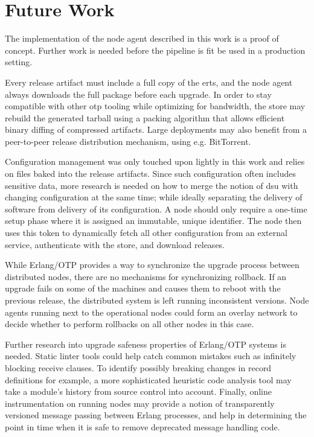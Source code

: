 \cleardoublepage
\section{Future Work}

The implementation of the node agent described in this work is a proof of concept. Further work is needed before the pipeline is fit be used in a production setting.

Every release artifact must include a full copy of the \acrshort{erts}, and the node agent always downloads the full package before each upgrade. In order to stay compatible with other \acrshort{otp} tooling while optimizing for bandwidth, the store may rebuild the generated tarball using a packing algorithm that allows efficient binary diffing of compressed artifacts.
Large deployments may also benefit from a peer-to-peer release distribution mechanism, using e.g. BitTorrent.

Configuration management was only touched upon lightly in this work and relies on files baked into the release artifacts. Since such configuration often includes sensitive data, more research is needed on how to merge the notion of \acrshort{dsu} with changing configuration at the same time; while ideally separating the delivery of software from delivery of its configuration. A node should only require a one-time setup phase where it is assigned an immutable, unique identifier. The node then uses this token to dynamically fetch all other configuration from an external service, authenticate with the store, and download releases.

While Erlang/OTP provides a way to synchronize the upgrade process between distributed nodes, there are no mechanisms for synchronizing rollback. If an upgrade fails on some of the machines and causes them to reboot with the previous release, the distributed system is left running inconsistent versions. Node agents running next to the operational nodes could form an overlay network to decide whether to perform rollbacks on all other nodes in this case.

Further research into upgrade safeness properties of Erlang/OTP systems is needed. Static linter tools could help catch common mistakes such as infinitely blocking receive clauses. To identify possibly breaking changes in record definitions for example, a more sophisticated heuristic code analysis tool may take a module's history from source control into account. Finally, online instrumentation on running nodes may provide a notion of transparently versioned message passing between Erlang processes, and help in determining the point in time when it is safe to remove deprecated message handling code.

